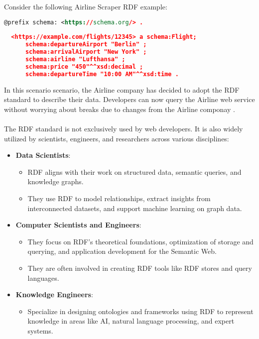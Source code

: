 Consider the following Airline Scraper RDF example:
\begin{lstlisting}[language=XML, caption={RDF representation of the flight data}, label={lst:rdf-example}]
  @prefix schema: <https://schema.org/> .
  
  <https://example.com/flights/12345> a schema:Flight;
      schema:departureAirport "Berlin" ;
      schema:arrivalAirport "New York" ;
      schema:airline "Lufthansa" ;
      schema:price "450"^^xsd:decimal ;
      schema:departureTime "10:00 AM"^^xsd:time .
  \end{lstlisting}
  In this scenario scenario, the Airline company has decided to adopt the RDF standard to describe their data.
  Developers can now query the Airline web service without worrying about breaks due to changes from the Airline componay \cite{herman2003semanticweb}. 
\\
\\
The RDF standard is not exclusively used by web developers. It is also widely utilized by scientists, engineers, and researchers across various disciplines:
\begin{itemize}
  \item \textbf{Data Scientists}:
  \begin{itemize}
      \item RDF aligns with their work on structured data, semantic queries, and knowledge graphs.
      \item They use RDF to model relationships, extract insights from interconnected datasets, and support machine learning on graph data.
  \end{itemize}
  
  \item \textbf{Computer Scientists and Engineers}:
  \begin{itemize}
      \item They focus on RDF’s theoretical foundations, optimization of storage and querying, and application development for the Semantic Web.
      \item They are often involved in creating RDF tools like RDF stores and query languages.
  \end{itemize}
  
  \item \textbf{Knowledge Engineers}:
  \begin{itemize}
      \item Specialize in designing ontologies and frameworks using RDF to represent knowledge in areas like AI, natural language processing, and expert systems.
  \end{itemize}
\end{itemize}

